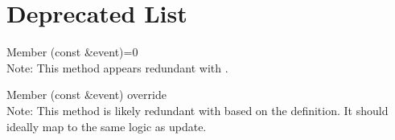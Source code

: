 \chapter{Deprecated List }
\hypertarget{deprecated}{}\label{deprecated}

\begin{DoxyRefList}
\item[Member \doxylink{classIObserver_a325451b0d0100feaad6f683850a616dc}{IObserver\+::notify} (const \doxylink{structEvent}{Event} \&event)=0]\hfill \\
\label{deprecated__deprecated000001}%
%
Note\+: This method appears redundant with . 
\item[Member \doxylink{classLogger_a96a2b88ee6d81d3ecf0fed3a6291c9a2}{Logger\+::notify} (const \doxylink{structEvent}{Event} \&event) override]\hfill \\
\label{deprecated__deprecated000002}%
%
Note\+: This method is likely redundant with  based on the  definition. It should ideally map to the same logic as {\ttfamily update}.
\end{DoxyRefList}